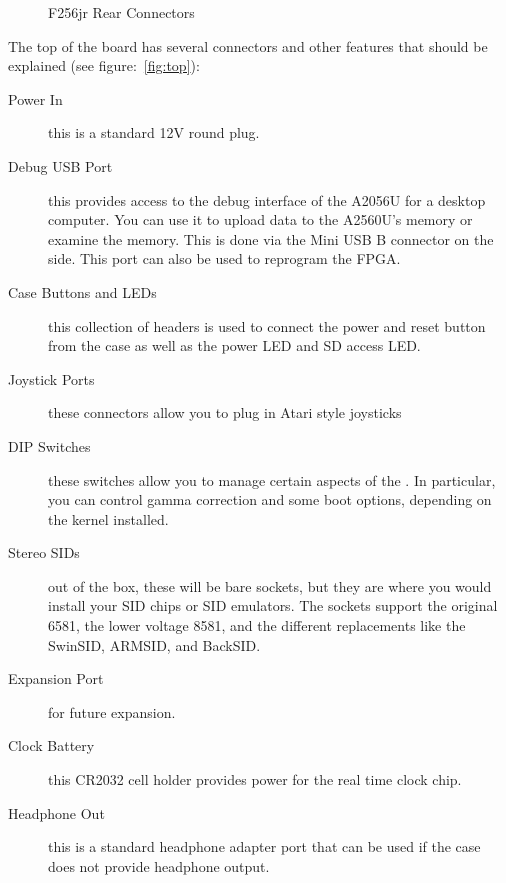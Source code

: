 \begin{figure}[ht]
    \begin{center}
    \end{center}
    \caption{F256jr Rear Connectors}
    \label{fig:rear}
\end{figure}

The top of the board has several connectors and other features that should be explained (see figure:~\ref{fig:top}):

\begin{description}
    \item[Power In] this is a standard 12V round plug.

    \item[Debug USB Port] this provides access to the debug interface
      of the A2056U for a desktop computer. You can use it to upload
      data to the A2560U's memory or examine the memory. This is done
      via the Mini USB B connector on the side. This port can also be
      used to reprogram the FPGA.

    \item[Case Buttons and LEDs] this collection of headers is used to connect the power and reset button from the case as well as the power LED and SD access LED.

    \item[Joystick Ports] these connectors allow you to plug in Atari style joysticks

    \item[DIP Switches] these switches allow you to manage certain aspects of the \foenix. In particular, you can control gamma correction and some boot options, depending on the kernel installed.

    \item[Stereo SIDs] out of the box, these will be bare sockets, but they are where you would install your SID chips or SID emulators. The sockets support the original 6581, the lower voltage 8581, and the different replacements like the SwinSID, ARMSID, and BackSID.

    \item[Expansion Port] for future expansion.

    \item[Clock Battery] this CR2032 cell holder provides power for the real time clock chip.

    \item[Headphone Out] this is a standard headphone adapter port that can be used if the case does not provide headphone output.
\end{description}

